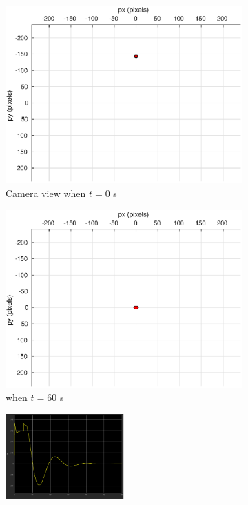 \begin{figure}[htbp]
\begin{subfigure}[t]{0.45\linewidth}
		\includegraphics[width=\textwidth]{images/chapter4/image_camera_0mps}
		\caption{Camera view when $t=0$ s}
	\end{subfigure}
	\begin{subfigure}[t]{0.45\linewidth}
		\includegraphics[width=\textwidth]{images/chapter4/image_camera_0mps_60s}
		\caption{when $t=60$ s}
	\end{subfigure}
	\begin{subfigure}[t]{0.8\linewidth}
		\centering
		\includegraphics[width=0.5\textwidth]{images/chapter4/image_Ex_0mps}

\end{subfigure}
\end{figure}
